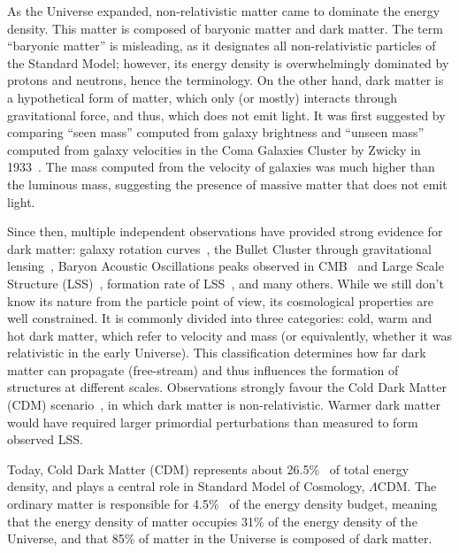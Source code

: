 \documentclass[../../thesis.tex]{subfiles}
\begin{document}
As the Universe expanded, non-relativistic matter came to dominate the energy density. This matter is composed of baryonic matter and dark matter. The term \enquote{baryonic matter} is misleading, as it designates all non-relativistic particles of the Standard Model; however, its energy density is overwhelmingly dominated by protons and neutrons, hence the terminology. On the other hand, dark matter is a hypothetical form of matter, which only (or mostly) interacts through gravitational force, and thus, which does not emit light. It was first suggested by comparing \enquote{seen mass} computed from galaxy brightness and \enquote{unseen mass} computed from galaxy velocities in the Coma Galaxies Cluster by Zwicky in 1933~\cite{zwicky1933}. The mass computed from the velocity of galaxies was much higher than the luminous mass, suggesting the presence of massive matter that does not emit light. 

Since then, multiple independent observations have provided strong evidence for dark matter: galaxy rotation curves~\cite{rubin1980}, the Bullet Cluster through gravitational lensing~\cite{bullet_cluster}, Baryon Acoustic Oscillations peaks observed in CMB~\cite{planck2018VI} and Large Scale Structure (LSS)~\cite{SDSS2017,DESI2024III}, formation rate of LSS~\cite{lls_formation_rate_cdm}, and many others. While we still don't know its nature from the particle point of view, its cosmological properties are well constrained. It is commonly divided into three categories: cold, warm and hot dark matter, which refer to velocity and mass (or equivalently, whether it was relativistic in the early Universe). This classification determines how far dark matter can propagate (free-stream) and thus influences the formation of structures at different scales. Observations strongly favour the Cold Dark Matter (CDM) scenario~\cite{cold_dark_matter}, in which dark matter is non-relativistic. Warmer dark matter would have required larger primordial perturbations than measured to form observed LSS. 

Today, Cold Dark Matter (CDM) represents about 26.5\%~\cite{planck2018VI} of total energy density, and plays a central role in Standard Model of Cosmology, $\Lambda$CDM. The ordinary matter is responsible for 4.5\%~\cite{planck2018VI} of the energy density budget, meaning that the energy density of matter occupies 31\% of the energy density of the Universe, and that 85\% of matter in the Universe is composed of dark matter.
\end{document}
